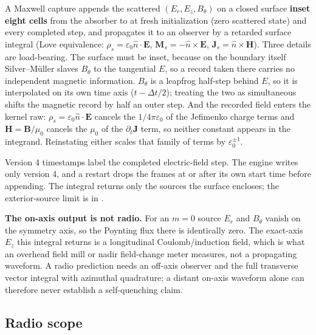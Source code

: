 \documentclass[11pt]{article}
\begin{document}
A Maxwell capture appends the scattered $(E_r, E_z, B_\theta)$ on a closed
surface \textbf{inset eight cells} from the absorber to
 at fresh initialization (zero scattered state)
and every completed step, and
 propagates it to an observer by a
retarded surface integral (Love equivalence: $\rho_s = \varepsilon_0
\hat n\!\cdot\!\mathbf{E}$, $\mathbf{M}_s = -\hat n\times\mathbf{E}$,
$\mathbf{J}_s = \hat n\times\mathbf{H}$). Three details are load-bearing. The
surface must be inset, because on the boundary itself Silver--M\"uller
slaves $B_\theta$ to the tangential $E$, so a record taken there carries no
independent magnetic information. $B_\theta$ is a leapfrog half-step
behind $E$, so it is interpolated on its own time axis
($t - \Delta t/2$); treating the two as simultaneous shifts the magnetic
record by half an outer step. And the recorded field enters the kernel raw:
$\rho_s = \varepsilon_0 \hat n\!\cdot\!\mathbf{E}$ cancels the
$1/4\pi\varepsilon_0$ of the Jefimenko charge terms and
$\mathbf{H}=\mathbf{B}/\mu_0$ cancels the $\mu_0$ of the
$\partial_t\mathbf{J}$ term, so neither constant appears in the integrand.
Reinstating either scales that family of terms by $\varepsilon_0^{\pm1}$.

Version 4 timestamps label the completed electric-field step. The engine writes only version 4, and a restart drops
the frames at or after its own start time before appending.
The integral returns only the sources the surface encloses; the
exterior-source limit is in .

\textbf{The on-axis output is not radio.} For an $m=0$ source $E_r$ and
$B_\theta$ vanish on the symmetry axis, so the Poynting flux there is
identically zero. The exact-axis $E_z$ this integral returns
is a longitudinal Coulomb/induction field, which is what an overhead field
mill or nadir field-change meter measures, not a propagating waveform. A
radio prediction needs an off-axis observer and the full transverse vector
integral with azimuthal quadrature; a distant on-axis waveform alone can
therefore never establish a self-quenching claim.

\subsection{Radio scope}
\end{document}
